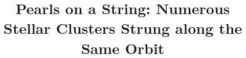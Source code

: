 \documentclass[twocolumn]{aastex631}
\begin{document}
\title{Pearls on a String: Numerous Stellar Clusters Strung along the Same Orbit}


\end{document}
